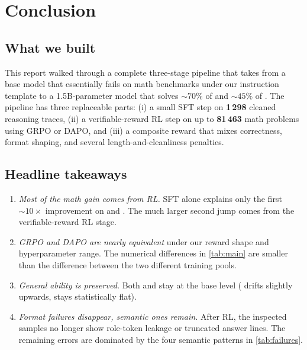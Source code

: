 \section{Conclusion}
\label{sec:conclusion}

\subsection{What we built}
This report walked through a complete three-stage pipeline that takes
 from a base model that essentially fails on math
benchmarks under our instruction template to a 1.5B-parameter model that
solves $\sim70\%$ of  and $\sim45\%$ of . The
pipeline has three replaceable parts: (i) a small SFT step on
\textbf{1\,298} cleaned reasoning traces, (ii) a verifiable-reward RL
step on up to \textbf{81\,463} math problems using GRPO or DAPO, and
(iii) a composite reward that mixes correctness, format shaping, and
several length-and-cleanliness penalties.

\subsection{Headline takeaways}
\begin{enumerate}
  \item \emph{Most of the math gain comes from RL.} SFT alone explains
    only the first $\sim10\!\times$ improvement on  and
    . The much larger second jump comes from the
    verifiable-reward RL stage.
  \item \emph{GRPO and DAPO are nearly equivalent} under our reward
    shape and hyperparameter range. The numerical differences in
    \cref{tab:main} are smaller than the difference between the two
    different training pools.
  \item \emph{General ability is preserved.} Both  and
     stay at the base level ( drifts slightly
    upwards,  stays statistically flat).
  \item \emph{Format failures disappear, semantic ones remain.} After
    RL, the inspected samples no longer show role-token leakage or
    truncated answer lines. The remaining errors are dominated by the
    four semantic patterns in \cref{tab:failures}.
\end{enumerate}

